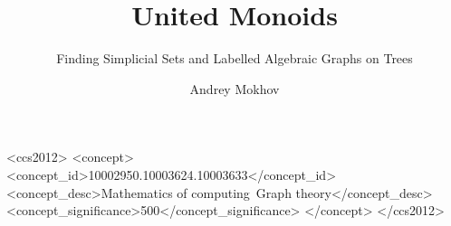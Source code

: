 \documentclass[english,submission]{programming}
\begin{document}

\title{United Monoids}
\subtitle{Finding Simplicial Sets and Labelled Algebraic Graphs on Trees}
\author{Andrey Mokhov}


\begin{CCSXML}
<ccs2012>
<concept>
<concept_id>10002950.10003624.10003633</concept_id>
<concept_desc>Mathematics of computing~Graph theory</concept_desc>
<concept_significance>500</concept_significance>
</concept>
</ccs2012>
\end{CCSXML}


\maketitle
\end{document}
